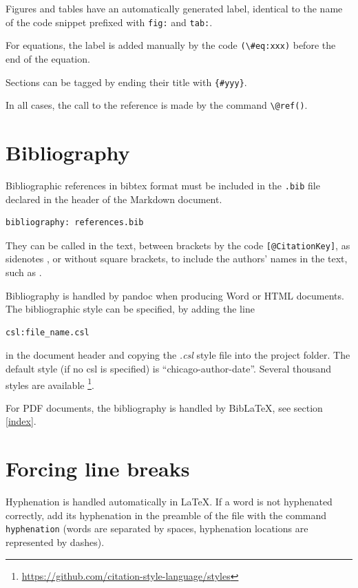 \documentclass[
  12pt,
  american,
  a4paper,
  extrafontsizes,onecolumn,openright
  ]{memoir}
\begin{document}
Figures and tables have an automatically generated label, identical to the name of the code snippet prefixed with \texttt{fig:} and \texttt{tab:}.

For equations, the label is added manually by the code \texttt{(\textbackslash{}\#eq:xxx)} before the end of the equation.

Sections can be tagged by ending their title with \texttt{\{\#yyy\}}.

In all cases, the call to the reference is made by the command \texttt{\textbackslash{}@ref()}.

\section{Bibliography}\label{bibliography}

Bibliographic references in bibtex format must be included in the \texttt{.bib} file declared in the header of the Markdown document.

\begin{verbatim}
bibliography: references.bib
\end{verbatim}

They can be called in the text, between brackets by the code \texttt{{[}@CitationKey{]}}, as sidenotes \autocite{Xie2016}, or without square brackets, to include the authors' names in the text, such as \textcite{Xie2018} .

Bibliography is handled by pandoc when producing Word or HTML documents.
The bibliographic style can be specified, by adding the line

\begin{verbatim}
csl:file_name.csl
\end{verbatim}

in the document header and copying the \emph{.csl} style file into the project folder.
The default style (if no csl is specified) is \enquote{chicago-author-date}.
Several thousand styles are available \footnote{\url{https://github.com/citation-style-language/styles}}.

For PDF documents, the bibliography is handled by BibLaTeX, see section \ref{index}.

\section{Forcing line breaks}\label{forcing-line-breaks}

Hyphenation is handled automatically in LaTeX.
If a word is not hyphenated correctly, add its hyphenation in the preamble of the file with the command \texttt{hyphenation} (words are separated by spaces, hyphenation locations are represented by dashes).
\end{document}
